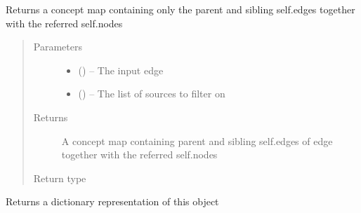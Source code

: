 \documentclass[letterpaper,10pt,english]{sphinxmanual}
\begin{document}
\begin{fulllineitems}
\begin{fulllineitems}
\begin{quote}
\begin{description}
\end{description}\end{quote}

\end{fulllineitems}


\begin{fulllineitems}
\label{\detokenize{concept_map:concept_map.ConceptMap.get_partial_map}}
Returns a concept map containing only the parent and sibling self.edges together with the referred self.nodes
\begin{quote}\begin{description}
\item[{Parameters}] \leavevmode\begin{itemize}
\item {} 
 ({\hyperref[\detokenize{edge:edge.Edge}]{}}) -- The input edge

\item {} 
 (\href{https://docs.python.org/2/library/functions.html\#list}{}\sphinxstyleliteralemphasis{(}\href{https://docs.python.org/2/library/string.html\#module-string}{}\sphinxstyleliteralemphasis{)}\sphinxstyleliteralemphasis{}) -- The list of sources to filter on

\end{itemize}

\item[{Returns}] \leavevmode
A concept map containing parent and sibling self.edges of edge together with the referred self.nodes

\item[{Return type}] \leavevmode
{\hyperref[\detokenize{concept_map:concept_map.ConceptMap}]{}}

\end{description}\end{quote}

\end{fulllineitems}


\begin{fulllineitems}
\label{\detokenize{concept_map:concept_map.ConceptMap.to_dict}}
Returns a dictionary representation of this object


\end{fulllineitems}
\end{fulllineitems}
\end{document}
